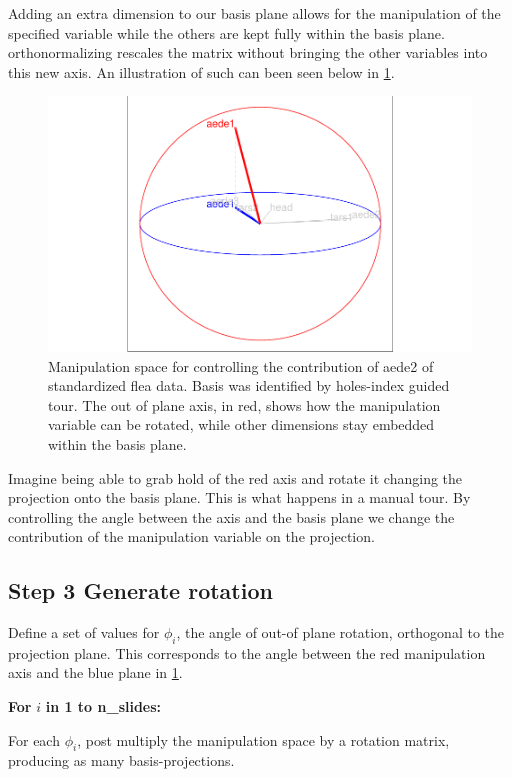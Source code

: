 \documentclass{monashthesis}
\begin{document}
Adding an extra dimension to our basis plane allows for the manipulation
of the specified variable while the others are kept fully within the
basis plane. orthonormalizing rescales the matrix without bringing the
other variables into this new axis. An illustration of such can been
seen below in \ref{fig:step2}.

\begin{figure}
\centering
\includegraphics{thesis_files/figure-latex/step2-1.pdf}
\caption{\label{fig:step2}Manipulation space for controlling the
contribution of aede2 of standardized flea data. Basis was identified by
holes-index guided tour. The out of plane axis, in red, shows how the
manipulation variable can be rotated, while other dimensions stay
embedded within the basis plane.}
\end{figure}

Imagine being able to grab hold of the red axis and rotate it changing
the projection onto the basis plane. This is what happens in a manual
tour. By controlling the angle between the axis and the basis plane we
change the contribution of the manipulation variable on the projection.

\subsection{Step 3 Generate rotation}\label{step-3-generate-rotation}

Define a set of values for \(\phi_i\), the angle of out-of plane
rotation, orthogonal to the projection plane. This corresponds to the
angle between the red manipulation axis and the blue plane in
\ref{fig:step2}.

\textbf{For } \(i\) \textbf{in 1 to n\_slides:}

For each \(\phi_i\), post multiply the manipulation space by a rotation
matrix, producing as many basis-projections.
\end{document}
